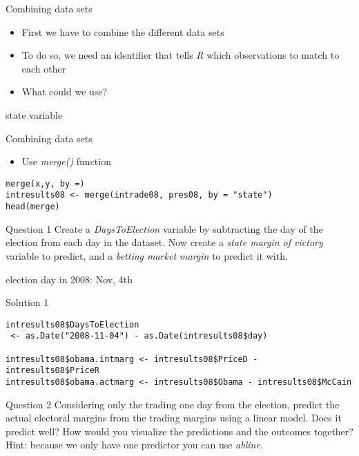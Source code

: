 \documentclass[presentation]{beamer}
\begin{document}
\begin{frame}[label={sec:org52fb95b}]{Combining data sets}
\begin{itemize}
\item First we have to combine the different data sets
\item To do so, we need an identifier that tells \emph{R} which observations to match to each other
\item What could we use?
\end{itemize}

\pause

\alert{state variable}
\end{frame}

\begin{frame}[fragile,label={sec:org3f7dc2d}]{Combining data sets}
 \begin{itemize}
\item Use \emph{merge()} function
\end{itemize}

\begin{verbatim}
merge(x,y, by =)
intresults08 <- merge(intrade08, pres08, by = "state")
head(merge)
\end{verbatim}
\end{frame}


\begin{frame}[label={sec:org67606a8}]{Question 1}
Create a \emph{DaysToElection} variable by subtracting the day of the election from each day in the dataset. Now create a \emph{state margin of victory} variable to predict, and a \emph{betting market margin} to predict it with.

\alert{election day in 2008: Nov, 4th}
\end{frame}

\begin{frame}[fragile,shrink=20,label={sec:org0b139f1}]{Solution 1}
 \begin{verbatim}
intresults08$DaysToElection
 <- as.Date("2008-11-04") - as.Date(intresults08$day)

intresults08$obama.intmarg <- intresults08$PriceD - intresults08$PriceR
intresults08$obama.actmarg <- intresults08$Obama - intresults08$McCain
\end{verbatim}
\end{frame}


\begin{frame}[label={sec:org44d59a7}]{Question 2}
Considering only the trading \alert{one day from the election}, predict the actual electoral margins from the trading margins using a linear model. Does it predict well? How would you visualize the predictions and the outcomes together? Hint: because we only have one predictor you can use \emph{abline}.
\end{frame}
\end{document}
